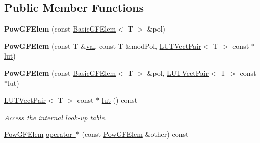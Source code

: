 \subsection*{Public Member Functions}
\begin{DoxyCompactItemize}
\item 
\mbox{\label{class_g_flinalg_1_1_pow_g_f_elem_a05d9419939a8c5f4b61825efaaddea26}} 
{\bfseries Pow\+G\+F\+Elem} (const \mbox{\hyperlink{class_g_flinalg_1_1_basic_g_f_elem}{Basic\+G\+F\+Elem}}$<$ T $>$ \&pol)
\item 
\mbox{\label{class_g_flinalg_1_1_pow_g_f_elem_a2aea20f03c87c476108c6c0f36661364}} 
{\bfseries Pow\+G\+F\+Elem} (const T \&\mbox{\hyperlink{class_g_flinalg_1_1_basic_g_f_elem_ab8acf4373ba8172d801228d16efcc1d0}{val}}, const T \&mod\+Pol, \mbox{\hyperlink{struct_g_flinalg_1_1op_1_1_l_u_t_vect_pair}{L\+U\+T\+Vect\+Pair}}$<$ T $>$ const $\ast$\mbox{\hyperlink{class_g_flinalg_1_1_pow_g_f_elem_a0f716802ff84acd6544ab3c9aaa5ef2d}{lut}})
\item 
\mbox{\label{class_g_flinalg_1_1_pow_g_f_elem_afae8563966d9ceb838e0d1daa075e8ce}} 
{\bfseries Pow\+G\+F\+Elem} (const \mbox{\hyperlink{class_g_flinalg_1_1_basic_g_f_elem}{Basic\+G\+F\+Elem}}$<$ T $>$ \&pol, \mbox{\hyperlink{struct_g_flinalg_1_1op_1_1_l_u_t_vect_pair}{L\+U\+T\+Vect\+Pair}}$<$ T $>$ const $\ast$\mbox{\hyperlink{class_g_flinalg_1_1_pow_g_f_elem_a0f716802ff84acd6544ab3c9aaa5ef2d}{lut}})
\item 
\mbox{\label{class_g_flinalg_1_1_pow_g_f_elem_a0f716802ff84acd6544ab3c9aaa5ef2d}} 
\mbox{\hyperlink{struct_g_flinalg_1_1op_1_1_l_u_t_vect_pair}{L\+U\+T\+Vect\+Pair}}$<$ T $>$ const  $\ast$ \mbox{\hyperlink{class_g_flinalg_1_1_pow_g_f_elem_a0f716802ff84acd6544ab3c9aaa5ef2d}{lut}} () const
\begin{DoxyCompactList}\small\item\em Access the internal look-\/up table. \end{DoxyCompactList}\item 
\mbox{\hyperlink{class_g_flinalg_1_1_pow_g_f_elem}{Pow\+G\+F\+Elem}} \mbox{\hyperlink{class_g_flinalg_1_1_pow_g_f_elem_af1205ad68d41bbc4df5d88e1895e1f46}{operator $\ast$}} (const \mbox{\hyperlink{class_g_flinalg_1_1_pow_g_f_elem}{Pow\+G\+F\+Elem}} \&other) const

\end{DoxyCompactItemize}
